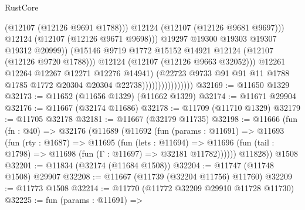 \begin{lexlean}{RustCore}
\begin{coremodule}
                                                (@12107 (@12126 @9691 @1788)))
                                              @12124
                                              (@12107 (@12126 @9681 @9697)))
                                            @12124
                                            (@12107 (@12126 @9671 @9698)))
                                          @19297
                                          @19300
                                          @19303
                                          @19307
                                          @19312
                                          @20999))
                                      (@15146
                                        @9719
                                        @1772
                                        @15152
                                        @14921
                                        @12124
                                        (@12107 (@12126 @9720 @1788)))
                                      @12124
                                      (@12107 (@12126 @9663 @32052)))
                                    @12261
                                    @12264
                                    @12267
                                    @12271
                                    @12276
                                    @14941)
                                  (@22723
                                    @9733
                                    @91
                                    @91
                                    @11
                                    @1788
                                    @1785
                                    @1772
                                    @20304
                                    @20304
                                    @22738))))))))))))))))
@32169 := @11650 @1329
@32173 := @11652 (@11656 @1329) (@11662 @1329)
@32174 := @11671 @29904
@32176 := @11667 (@32174 @11686)
@32178 := @11709 (@11710 @1329)
@32179 := @11705 @32178
@32181 := @11667 (@32179 @11735)
@32198 := @11666
    (fun (fn : @40) =>
    @32176
      (@11689
        (@11692
          (fun (params : @11691) =>
          @11693
            (fun (rty : @1687) =>
            @11695
              (fun (lets : @11694) =>
              @11696 (fun (tail : @1798) => @11698 (fun (Γ : @11697) => @32181 @11782))))))
        @11828))
    @1508
@32201 := @11834 (@32174 (@11684 @1508))
@32204 := @11747 (@11748 @1508) @29907
@32208 := @11667 (@11739 (@32204 @11756) @11760)
@32209 := @11773 @1508
@32214 := @11770 (@11772 @32209 @29910 @11728 @11730)
@32225 := fun (params : @11691) =>

\end{coremodule}
\end{lexlean}

